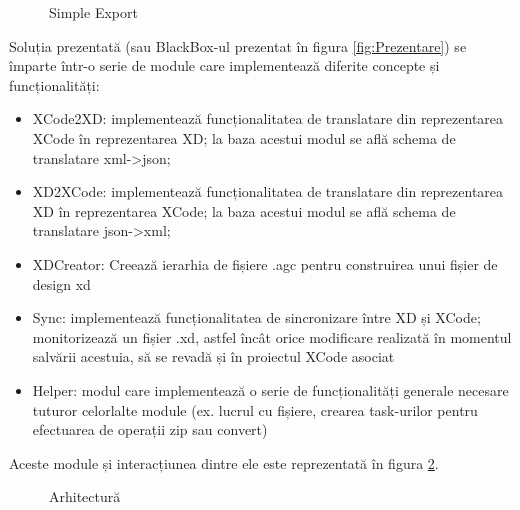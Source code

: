 \begin{figure}[!htbp]
\centering
{}
\caption{Simple Export} \label{fig:Export}
\end{figure}


Soluția prezentată (sau BlackBox-ul prezentat în figura \ref{fig:Prezentare}) se împarte într-o serie de module care implementează diferite concepte și funcționalități:
\begin{itemize}  
\item XCode2XD: implementează funcționalitatea de translatare din reprezentarea XCode în reprezentarea XD; la baza acestui modul se află schema de translatare xml->json;
\item XD2XCode: implementează funcționalitatea de translatare din reprezentarea XD în reprezentarea XCode; la baza acestui modul se află schema de translatare json->xml;
\item XDCreator: Creează ierarhia de fișiere .agc pentru construirea unui fișier de design xd
\item Sync: implementează funcționalitatea de sincronizare între XD și XCode; monitorizează un fișier .xd, astfel încât orice modificare realizată în momentul salvării acestuia, să se revadă și în proiectul XCode asociat
\item Helper: modul care implementează o serie de funcționalități generale necesare tuturor celorlalte module (ex. lucrul cu fișiere, crearea task-urilor pentru efectuarea de operații zip sau convert)
\end{itemize}

Aceste module și interacțiunea dintre ele este reprezentată în figura \ref{fig:Arhitectura}.

\begin{figure}[!htbp]
\centering
{}
\caption{Arhitectură} \label{fig:Arhitectura}
\end{figure}

